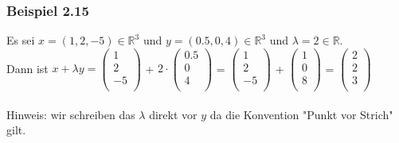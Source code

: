 \documentclass{article}
\begin{document}
\subsubsection*{Beispiel 2.15}
Es sei $x=(1,2,-5) \in \mathbb{R}^3$ und $y=(0.5, 0, 4) \in \mathbb{R}^3$ und $\lambda = 2 \in \mathbb{R}$. \\
Dann ist $x+\lambda y = \begin{pmatrix}
    1 \\
    2 \\
    -5 \\
\end{pmatrix}$ + $2 \cdot \begin{pmatrix}
    0.5 \\
    0 \\
    4 \\
\end{pmatrix}$ = $\begin{pmatrix}
    1 \\
    2 \\
    -5 \\
\end{pmatrix}$ + $\begin{pmatrix}
    1 \\
    0 \\
    8 \\
\end{pmatrix}$ = $\begin{pmatrix}
    2 \\
    2 \\
    3 \\
\end{pmatrix}$ \\
\\
Hinweis: wir schreiben das $\lambda$ direkt vor $y$ da die Konvention "Punkt vor Strich" gilt. \\
\\
\end{document}
